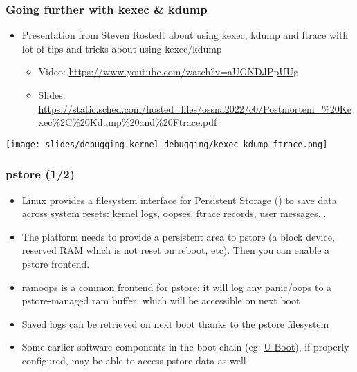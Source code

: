 \begin{frame}[fragile]
  \frametitle{Going further with kexec \& kdump}
  \begin{itemize}
    \item Presentation from Steven Rostedt about using kexec, kdump and ftrace
          with lot of tips and tricks about using kexec/kdump
    \begin{itemize}
      \item Video: \url{https://www.youtube.com/watch?v=aUGNDJPpUUg}
      \item Slides: \url{https://static.sched.com/hosted_files/ossna2022/c0/Postmortem_%20Kexec%2C%20Kdump%20and%20Ftrace.pdf}
    \end{itemize}
  \end{itemize}
  \vspace{0.1cm}
  \begin{center}
  \center\texttt{[image: slides/debugging-kernel-debugging/kexec\_kdump\_ftrace.png]}
  \end{center}
\end{frame}

\begin{frame}[fragile]
  \frametitle{pstore (1/2)}
	\begin{itemize}
    \item Linux provides a filesystem interface for Persistent Storage
      () to save data across system resets: kernel logs, oopses,
      ftrace records, user messages...
    \item The platform needs to provide a persistent area to pstore (a
      block device, reserved RAM which is not reset on reboot,
      etc). Then you can enable a pstore frontend.
    \item
      \href{https://www.kernel.org/doc/html/latest/admin-guide/ramoops.html}{ramoops}
      is a common frontend for pstore: it will log any panic/oops to a
      pstore-managed ram buffer, which will be accessible on next boot
    \item Saved logs can be retrieved on next boot thanks to the pstore
      filesystem
    \item Some earlier software components in the boot chain (eg:
      \href{https://docs.u-boot.org/en/v2021.01/usage/pstore.html}{U-Boot}),
      if properly configured, may be able to access pstore data as well
  \end{itemize}
\end{frame}

